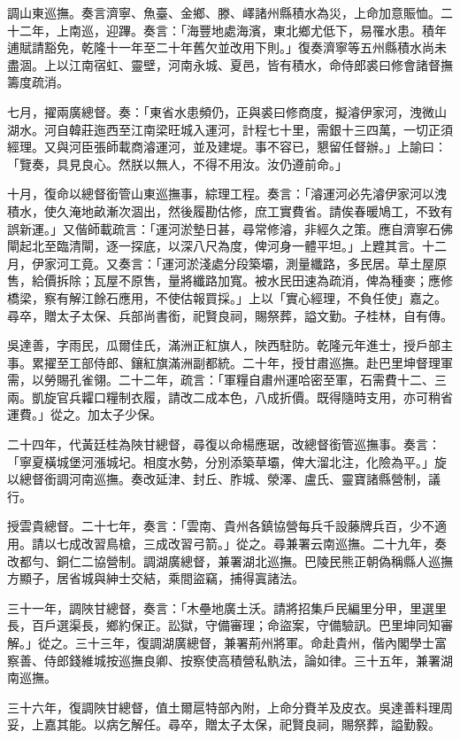 \begin{pinyinscope}
調山東巡撫。奏言濟寧、魚臺、金鄉、滕、嶧諸州縣積水為災，上命加意賑恤。二十二年，上南巡，迎蹕。奏言：「海豐地處海濱，東北鄉尤低下，易罹水患。積年逋賦請豁免，乾隆十一年至二十年舊欠並改用下則。」復奏濟寧等五州縣積水尚未盡涸。上以江南宿虹、靈壁，河南永城、夏邑，皆有積水，命侍郎裘曰修會諸督撫籌度疏消。

七月，擢兩廣總督。奏：「東省水患頻仍，正與裘曰修商度，擬濬伊家河，洩微山湖水。河自韓莊迤西至江南梁旺城入運河，計程七十里，需銀十三四萬，一切正須經理。又與河臣張師載商濬運河，並及建堤。事不容已，懇留任督辦。」上諭曰：「覽奏，具見良心。然朕以無人，不得不用汝。汝仍遵前命。」

十月，復命以總督銜管山東巡撫事，綜理工程。奏言：「濬運河必先濬伊家河以洩積水，使久淹地畝漸次涸出，然後履勘估修，庶工實費省。請俟春暖鳩工，不致有誤新運。」又偕師載疏言：「運河淤墊日甚，尋常修濬，非經久之策。應自濟寧石佛閘起北至臨清閘，逐一探底，以深八尺為度，俾河身一體平坦。」上韙其言。十二月，伊家河工竟。又奏言：「運河淤淺處分段築壩，測量纖路，多民居。草土屋原售，給價拆除；瓦屋不原售，量將纖路加寬。被水民田速為疏消，俾為種麥；應修橋梁，察有解江餘石應用，不使估報買採。」上以「實心經理，不負任使」嘉之。尋卒，贈太子太保、兵部尚書銜，祀賢良祠，賜祭葬，謚文勤。子桂林，自有傳。

吳達善，字雨民，瓜爾佳氏，滿洲正紅旗人，陜西駐防。乾隆元年進士，授戶部主事。累擢至工部侍郎、鑲紅旗滿洲副都統。二十年，授甘肅巡撫。赴巴里坤督理軍需，以勞賜孔雀翎。二十二年，疏言：「軍糧自肅州運哈密至軍，石需費十二、三兩。凱旋官兵糶口糧制衣履，請改二成本色，八成折價。既得隨時支用，亦可稍省運費。」從之。加太子少保。

二十四年，代黃廷桂為陜甘總督，尋復以命楊應琚，改總督銜管巡撫事。奏言：「寧夏橫城堡河漲城圮。相度水勢，分別添築草壩，俾大溜北注，化險為平。」旋以總督銜調河南巡撫。奏改延津、封丘、胙城、滎澤、盧氏、靈寶諸縣營制，議行。

授雲貴總督。二十七年，奏言：「雲南、貴州各鎮協營每兵千設藤牌兵百，少不適用。請以七成改習鳥槍，三成改習弓箭。」從之。尋兼署云南巡撫。二十九年，奏改都勻、銅仁二協營制。調湖廣總督，兼署湖北巡撫。巴陵民熊正朝偽稱縣人巡撫方顯子，居省城與紳士交結，乘間盜竊，捕得寘諸法。

三十一年，調陜甘總督，奏言：「木壘地廣土沃。請將招集戶民編里分甲，里選里長，百戶選渠長，鄉約保正。訟獄，守備審理；命盜案，守備驗訊。巴里坤同知審解。」從之。三十三年，復調湖廣總督，兼署荊州將軍。命赴貴州，偕內閣學士富察善、侍郎錢維城按巡撫良卿、按察使高積營私骫法，論如律。三十五年，兼署湖南巡撫。

三十六年，復調陜甘總督，值土爾扈特部內附，上命分賚羊及皮衣。吳達善料理周妥，上嘉其能。以病乞解任。尋卒，贈太子太保，祀賢良祠，賜祭葬，謚勤毅。


\end{pinyinscope}
